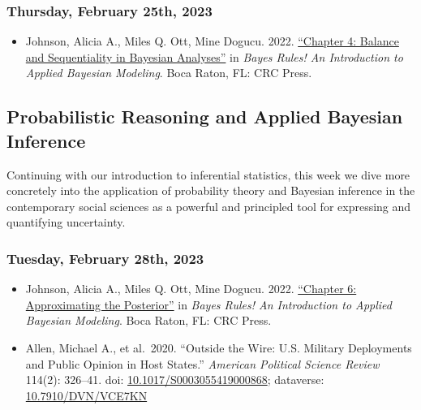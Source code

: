 \documentclass[12pt,]{article}
\providecommand{\tightlist}{%
  \setlength{\itemsep}{0pt}\setlength{\parskip}{0pt}}
\begin{document}
\hypertarget{thursday-february-25th-2023}{%
\subsubsection{Thursday, February 25th,
2023}\label{thursday-february-25th-2023}}

\begin{itemize}
\tightlist
\item
  Johnson, Alicia A., Miles Q. Ott, Mine Dogucu. 2022.
  \href{https://www.bayesrulesbook.com/chapter-4.html}{``Chapter 4:
  Balance and Sequentiality in Bayesian Analyses''} in \emph{Bayes
  Rules! An Introduction to Applied Bayesian Modeling}. Boca Raton, FL:
  CRC Press.
\end{itemize}

\hypertarget{probabilistic-reasoning-and-applied-bayesian-inference}{%
\subsection{Probabilistic Reasoning and Applied Bayesian
Inference}\label{probabilistic-reasoning-and-applied-bayesian-inference}}

\noindent Continuing with our introduction to inferential statistics,
this week we dive more concretely into the application of probability
theory and Bayesian inference in the contemporary social sciences as a
powerful and principled tool for expressing and quantifying uncertainty.

\hypertarget{tuesday-february-28th-2023}{%
\subsubsection{Tuesday, February 28th,
2023}\label{tuesday-february-28th-2023}}

\begin{itemize}
\item
  Johnson, Alicia A., Miles Q. Ott, Mine Dogucu. 2022.
  \href{https://www.bayesrulesbook.com/chapter-6.html}{``Chapter 6:
  Approximating the Posterior''} in \emph{Bayes Rules! An Introduction
  to Applied Bayesian Modeling}. Boca Raton, FL: CRC Press.
\item
  Allen, Michael A., et al.~2020. ``Outside the Wire: U.S. Military
  Deployments and Public Opinion in Host States.'' \emph{American
  Political Science Review} 114(2): 326--41. doi:
  \href{https://doi.org/10.1017/S0003055419000868}{10.1017/S0003055419000868};
  dataverse:
  \href{https://dataverse.harvard.edu/dataset.xhtml?persistentId=doi:10.7910/DVN/VCE7KN}{10.7910/DVN/VCE7KN}
\end{itemize}
\end{document}
